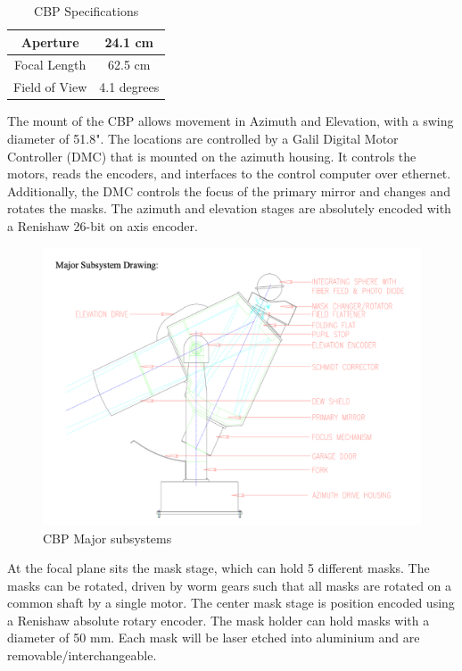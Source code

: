 \documentclass[SE,authoryear,lsstdraft,toc]{lsstdoc}
\begin{document}
\begin{table}[h!]
    \centering
    \begin{tabular}{|c|c|}
      \hline
       Aperture   & 24.1 cm \\
      \hline
      Focal Length   & 62.5 cm \\
      \hline
      Field of View & 4.1 degrees \\
      \hline
    \end{tabular}
    \caption{CBP Specifications}
    \label{tab:my_label}
\end{table}

The mount of the CBP allows movement in Azimuth and Elevation, with a swing diameter of 51.8". 
The locations are controlled by a Galil Digital Motor Controller (DMC) that is mounted on the azimuth housing. It controls the motors, reads the encoders, and interfaces to the control computer over ethernet. 
Additionally, the DMC controls the focus of the primary mirror and changes and rotates the masks. 
The azimuth and elevation stages are absolutely encoded with a Renishaw 26-bit on axis encoder. 


\begin{figure}[h]
    \centering
    \includegraphics[width=\textwidth]{cbp_drawing.png}
    \caption{CBP Major subsystems}
    \label{fig:cbp_major_subsystems}
\end{figure}

At the focal plane sits the mask stage, which can hold 5 different masks. The masks can be rotated, driven by worm gears such that all masks are rotated on a common shaft by a single motor. The center mask stage is position encoded using a Renishaw absolute rotary encoder. The mask holder can hold masks with a diameter of 50 mm. Each mask will be laser etched into aluminium and are removable/interchangeable. 
\end{document}
